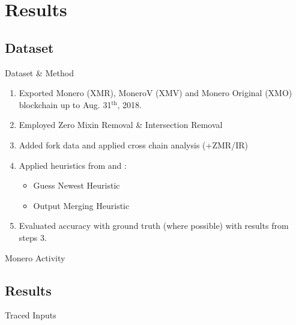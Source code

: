 \section{Results}
\subsection{Dataset}
\begin{frame}{Dataset \& Method}
	\begin{enumerate}
		\item Exported Monero (XMR), MoneroV (XMV) and Monero Original (XMO) blockchain up to Aug. 31$^\text{th}$, 2018.
		\item Employed Zero Mixin Removal \& Intersection Removal
		\item Added fork data and applied cross chain analysis (+ZMR/IR)
		\item Applied heuristics from \cite{kumar_traceability_2017} and \cite{moser_empirical_2018}:
		\begin{itemize}
			\item Guess Newest Heuristic
			\item Output Merging Heuristic
		\end{itemize}
		\item Evaluated accuracy with ground truth (where possible) with results from steps 3.
	\end{enumerate}
\end{frame}

\begin{frame}{Monero Activity}
	\def\imgFile{./img/slides/txs.tex}
	\resizebox{\textwidth}{!}{}
\end{frame}
\subsection{Results}
\begin{frame}{Traced Inputs}
	\def\imgFile{./img/slides/linked.tex}
	
\end{frame}
\begin{frame}
	\ringsizes
	\def\rsCSV{https://git.io/flUOZ}
	\def\imgFile{./img/slides/rsp1.tex}
	\resizebox{\textwidth}{!}{}
\end{frame}
\begin{frame}
	\ringsizes
	\def\rsCSV{https://git.io/flUOZ}
	\def\imgFile{./img/slides/rsp2.tex}
	\resizebox{\textwidth}{!}{}
\end{frame}


